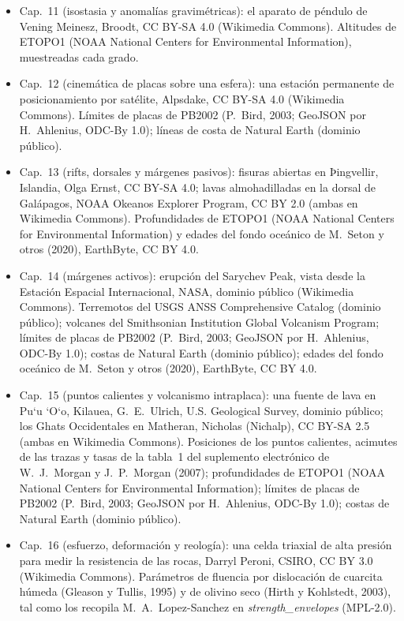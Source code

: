 \begin{itemize}
  \item Cap.~11 (isostasia y anomalías gravimétricas): el aparato de péndulo de Vening Meinesz, Broodt, CC BY-SA 4.0 (Wikimedia Commons). Altitudes de ETOPO1 (NOAA National Centers for Environmental Information), muestreadas cada grado.
  \item Cap.~12 (cinemática de placas sobre una esfera): una estación permanente de posicionamiento por satélite, Alpsdake, CC BY-SA 4.0 (Wikimedia Commons). Límites de placas de PB2002 (P.~Bird, 2003; GeoJSON por H.~Ahlenius, ODC-By 1.0); líneas de costa de Natural Earth (dominio público).
  \item Cap.~13 (rifts, dorsales y márgenes pasivos): fisuras abiertas en Þingvellir, Islandia, Olga Ernst, CC BY-SA 4.0; lavas almohadilladas en la dorsal de Galápagos, NOAA Okeanos Explorer Program, CC BY 2.0 (ambas en Wikimedia Commons). Profundidades de ETOPO1 (NOAA National Centers for Environmental Information) y edades del fondo oceánico de M.~Seton y otros (2020), EarthByte, CC BY 4.0.
  \item Cap.~14 (márgenes activos): erupción del Sarychev Peak, vista desde la Estación Espacial Internacional, NASA, dominio público (Wikimedia Commons). Terremotos del USGS ANSS Comprehensive Catalog (dominio público); volcanes del Smithsonian Institution Global Volcanism Program; límites de placas de PB2002 (P.~Bird, 2003; GeoJSON por H.~Ahlenius, ODC-By 1.0); costas de Natural Earth (dominio público); edades del fondo oceánico de M.~Seton y otros (2020), EarthByte, CC BY 4.0.
  \item Cap.~15 (puntos calientes y volcanismo intraplaca): una fuente de lava en Pu\textquoteleft u \textquoteleft O\textquoteleft o, Kilauea, G.~E.~Ulrich, U.S. Geological Survey, dominio público; los Ghats Occidentales en Matheran, Nicholas (Nichalp), CC BY-SA 2.5 (ambas en Wikimedia Commons). Posiciones de los puntos calientes, acimutes de las trazas y tasas de la tabla~1 del suplemento electrónico de W.~J.~Morgan y J.~P.~Morgan (2007); profundidades de ETOPO1 (NOAA National Centers for Environmental Information); límites de placas de PB2002 (P.~Bird, 2003; GeoJSON por H.~Ahlenius, ODC-By 1.0); costas de Natural Earth (dominio público).
  \item Cap.~16 (esfuerzo, deformación y reología): una celda triaxial de alta presión para medir la resistencia de las rocas, Darryl Peroni, CSIRO, CC BY 3.0 (Wikimedia Commons). Parámetros de fluencia por dislocación de cuarcita húmeda (Gleason y Tullis, 1995) y de olivino seco (Hirth y Kohlstedt, 2003), tal como los recopila M.~A.~Lopez-Sanchez en \emph{strength\_envelopes} (MPL-2.0).

\end{itemize}
